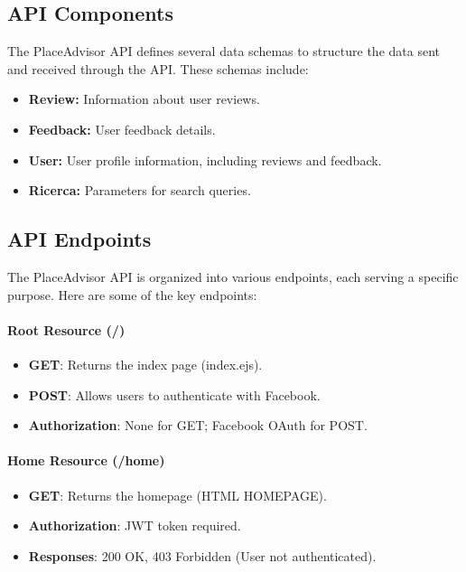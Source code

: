 \documentclass[../main.tex]{subfiles}
\begin{document}
\subsection{API Components}

The PlaceAdvisor API defines several data schemas to structure the data sent and received through the API. These schemas include:

\begin{itemize}
  \item \textbf{Review:} Information about user reviews.
  \item \textbf{Feedback:} User feedback details.
  \item \textbf{User:} User profile information, including reviews and feedback.
  \item \textbf{Ricerca:} Parameters for search queries.
\end{itemize}

\subsection{API Endpoints}

The PlaceAdvisor API is organized into various endpoints, each serving a specific purpose. Here are some of the key endpoints:

\paragraph{Root Resource (/)}

\begin{itemize}
  \item \textbf{GET}: Returns the index page (index.ejs).
  \item \textbf{POST}: Allows users to authenticate with Facebook.
  \item \textbf{Authorization}: None for GET; Facebook OAuth for POST.
\end{itemize}

\paragraph{Home Resource (/home)}

\begin{itemize}
  \item \textbf{GET}: Returns the homepage (HTML HOMEPAGE).
  \item \textbf{Authorization}: JWT token required.
  \item \textbf{Responses}: 200 OK, 403 Forbidden (User not authenticated).
\end{itemize}
\end{document}
